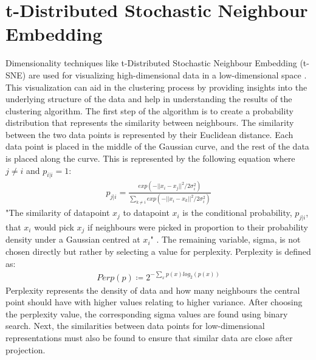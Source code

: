 \section{t-Distributed Stochastic Neighbour Embedding}
Dimensionality techniques like t-Distributed Stochastic Neighbour Embedding (t-SNE) are used for visualizing high-dimensional data in a low-dimensional space \cite{vanDerMaaten2008}. This visualization can aid in the clustering process by providing insights into the underlying structure of the data and help in understanding the results of the clustering algorithm. The first step of the algorithm is to create a probability distribution that represents the similarity between neighbours. The similarity between the two data points is represented by their Euclidean distance. Each data point is placed in the middle of the Gaussian curve, and the rest of the data is placed along the curve. This is represented by the following equation where $j \neq i$ and $p_{i|i} = 1$:
\begin{align}
p_{j|i} = \frac{exp(-||x_i - x_j||^2 / 2\sigma_i^2)}{\sum_{k \neq i}exp(-||x_i - x_k||^2 / 2\sigma_i^2)}
\end{align}
"The similarity of datapoint $x_j$ to datapoint $x_i$ is the conditional probability, $p_{j|i}$, that $x_i$ would pick $x_j$ if neighbours were picked in proportion to their probability density under a Gaussian centred at $x_i$" \cite{vanDerMaaten2008}. The remaining variable, sigma, is not chosen directly but rather by selecting a value for perplexity. Perplexity is defined as:
\begin{align}
Perp(p) \coloneq 2^{-\sum_x p(x)log_2(p(x))}
\end{align}
Perplexity represents the density of data and how many neighbours the central point should have with higher values relating to higher variance. After choosing the perplexity value, the corresponding sigma values are found using binary search. 
Next, the similarities between data points for low-dimensional representations must also be found to ensure that similar data are close after projection. 
